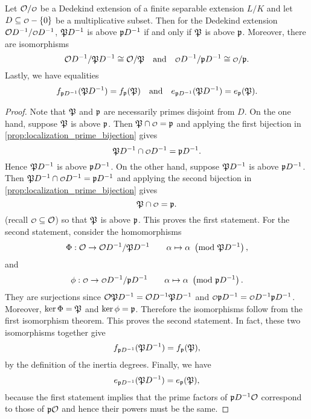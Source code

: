     \begin{proposition}\label{prop:ramification_setup_respects_localization}
      Let $\mc{O}/\smc{O}$ be a Dedekind extension of a finite separable extension $L/K$ and let $D \subseteq \smc{O}-\{0\}$ be a multiplicative subset. Then for the Dedekind extension $\mc{O}D^{-1}/\smc{O}D^{-1}$, $\mathfrak{P}D^{-1}$ is above $\mathfrak{p}D^{-1}$ if and only if $\mathfrak{P}$ is above $\mathfrak{p}$. Moreover, there are isomorphisms
      \[
        \mc{O}D^{-1}/\mf{P}D^{-1} \cong \mc{O}/\mf{P} \quad \text{and} \quad \smc{O}D^{-1}/\mf{p}D^{-1} \cong \smc{O}/\mf{p}.
      \]
      Lastly, we have equalities
      \[
        f_{\mathfrak{p}D^{-1}}(\mathfrak{P}D^{-1}) = f_{\mathfrak{p}}(\mathfrak{P}) \quad \text{and} \quad e_{\mathfrak{p}D^{-1}}(\mathfrak{P}D^{-1}) = e_{\mathfrak{p}}(\mathfrak{P}).
      \]
    \end{proposition}
    \begin{proof}
      Note that $\mathfrak{P}$ and $\mathfrak{p}$ are necessarily primes disjoint from $D$. On the one hand, suppose $\mathfrak{P}$ is above $\mathfrak{p}$. Then $\mf{P} \cap \smc{O} = \mf{p}$ and applying the first bijection in \cref{prop:localization_prime_bijection} gives
      \[
        \mf{P}D^{-1} \cap \smc{O}D^{-1} = \mf{p}D^{-1}.
      \]
      Hence $\mathfrak{P}D^{-1}$ is above $\mathfrak{p}D^{-1}$. On the other hand, suppose $\mathfrak{P}D^{-1}$ is above $\mathfrak{p}D^{-1}$. Then $\mf{P}D^{-1} \cap \smc{O}D^{-1} = \mf{p}D^{-1}$ and applying the second bijection in \cref{prop:localization_prime_bijection} gives
      \[
        \mf{P} \cap \smc{O} = \mf{p}.
      \]
      (recall $\smc{O} \subseteq \mc{O}$) so that $\mathfrak{P}$ is above $\mathfrak{p}$. This proves the first statement. For the second statement, consider the homomorphisms
      \[
        \Phi:\mathcal{O} \to \mathcal{O}D^{-1}/\mathfrak{P}D^{-1} \qquad \alpha \mapsto \alpha \ \left(\text{mod }\mathfrak{P}D^{-1}\right),
      \]
      and
      \[
        \phi:\smc{O} \to \smc{O}D^{-1}/\mf{p}D^{-1} \qquad \a \mapsto \a \tmod{\mf{p}D^{-1}}.
      \]
      They are surjections since $\mathcal{O}\mathfrak{P}D^{-1} = \mathcal{O}D^{-1}\mathfrak{P}D^{-1}$ and $\smc{O}\mf{p}D^{-1} = \smc{O}D^{-1}\mf{p}D^{-1}$. Moreover, $\ker\Phi = \mathfrak{P}$ and $\ker\phi = \mathfrak{p}$. Therefore the isomorphisms follow from the first isomorphism theorem. This proves the second statement. In fact, these two isomorphisms together give
      \[
        f_{\mathfrak{p}D^{-1}}(\mathfrak{P}D^{-1}) = f_{\mathfrak{p}}(\mathfrak{P}),
      \]
      by the definition of the inertia degrees. Finally, we have
      \[
        e_{\mathfrak{p}D^{-1}}(\mathfrak{P}D^{-1}) = e_{\mathfrak{p}}(\mathfrak{P}),
      \]
      because the first statement implies that the prime factors of $\mathfrak{p}D^{-1}\mathcal{O}$ correspond to those of $\mathfrak{p}\mathcal{O}$ and hence their powers must be the same.
    \end{proof}

